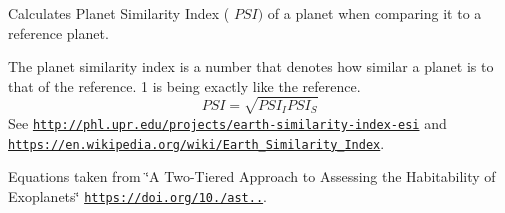 Calculates Planet Similarity Index ( $PSI)$ of a planet when comparing it to a reference planet. 

The planet similarity index is a number that denotes how similar a planet is to that of the reference. 1 is being exactly like the reference. \[PSI=\sqrt{PSI_I PSI_S}\] See \href{http://phl.upr.edu/projects/earth-similarity-index-esi}{\tt http\+://phl.\+upr.\+edu/projects/earth-\/similarity-\/index-\/esi} and \href{https://en.wikipedia.org/wiki/Earth_Similarity_Index}{\tt https\+://en.\+wikipedia.\+org/wiki/\+Earth\+\_\+\+Similarity\+\_\+\+Index}.

Equations taken from \char`\"{}\+A Two-\/\+Tiered Approach to Assessing the Habitability of Exoplanets\char`\"{} \href{https://doi.org/10.1089/ast.2010.0592}{\tt https\+://doi.\+org/10./ast..}.


